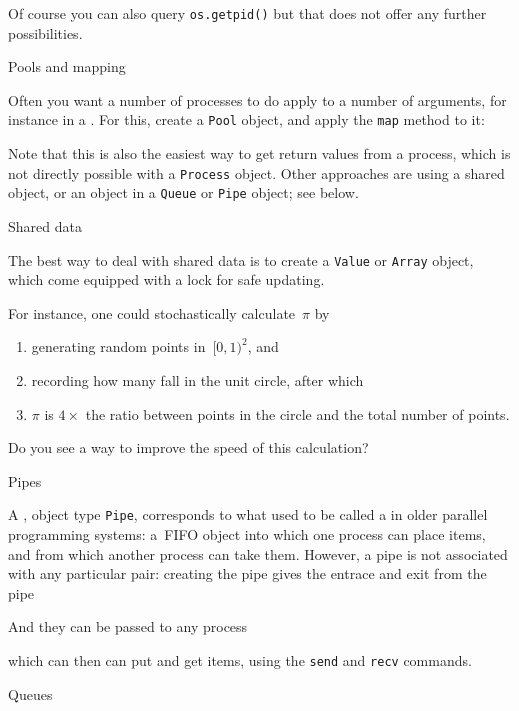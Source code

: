 Of course you can also query \lstinline+os.getpid()+
but that does not offer any further possibilities.


 {Pools and mapping}

Often you want a number of processes to do apply to a number of arguments,
for instance in a .
For this, create a \lstinline{Pool} object,
and apply the \lstinline{map} method to it:
%

Note that this is also the easiest way to get return values from a process,
which is not directly possible with a \lstinline{Process} object.
Other approaches are using a shared object,
or an object in a \lstinline{Queue} or \lstinline{Pipe} object; see below.

 {Shared data}

The best way to deal with shared data is to create
a \lstinline{Value} or \lstinline{Array} object,
which come equipped with a lock for safe updating.


For instance, one could stochastically calculate~$\pi$
by 
\begin{enumerate}
\item generating random points in~$[0,1)^2$, and
\item recording how many fall in the unit circle, after which
\item $\pi$ is $4\times$ the ratio between points in the circle
  and the total number of points.
\end{enumerate}


\begin{exercise}
  Do you see a way to improve the speed of this calculation?
\end{exercise}

 {Pipes}

A , object type \lstinline{Pipe},
corresponds to what used to be called a 
in older parallel programming systems:
a~\ac{FIFO} object into which one process can place items,
and from which another process can take them.
However, a pipe is not associated with any particular pair:
creating the pipe gives the entrace and exit from the pipe


And they can be passed to any process


which can then can put and get items,
using the \lstinline{send} and \lstinline{recv} commands.


 {Queues}
